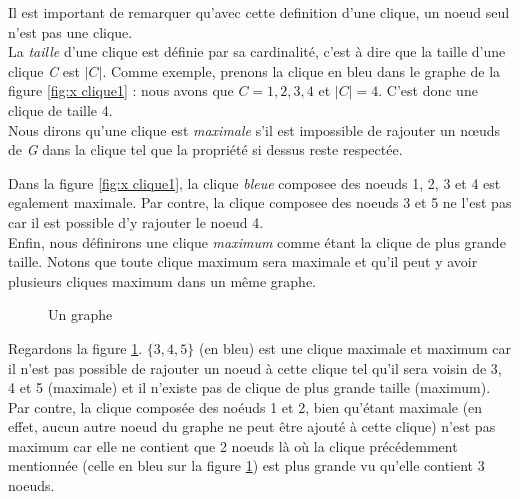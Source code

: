 \documentclass[a4paper, 12pt]{article}
\begin{document}
Il est important de remarquer qu'avec cette definition d'une clique, un noeud seul n'est pas une clique. \\

La \textit{taille} d'une clique est définie par sa cardinalité, c'est à dire que la taille d'une clique \emph{C} est \(|C|\). Comme exemple, prenons la clique en bleu dans le graphe de la figure \ref{fig:x clique1} : nous avons que \(C = {1,2,3,4}\) et \(|C| = 4\). C'est donc une clique de taille 4.\\

Nous dirons qu'une clique est \textit{maximale} s'il est impossible de rajouter un nœuds de \emph{G} dans la clique tel que la propriété si dessus reste respectée.

Dans la figure \ref{fig:x clique1}, la clique \textit{bleue} composee des noeuds 1, 2, 3 et 4 est egalement maximale. Par contre, la clique composee des noeuds 3 et 5 ne l'est pas car il est possible d'y rajouter le noeud 4.\\

Enfin, nous définirons une clique \textit{maximum} comme étant la clique de plus grande taille. Notons que toute clique maximum sera maximale et qu'il peut y avoir plusieurs cliques maximum dans un même graphe.

\begin{figure}[h]
  \begin{center}
\caption{Un graphe}
  \label{fig:x clique2}
\end{center}
\end{figure}

Regardons la figure \ref{fig:x clique2}. $ \{3, 4, 5\}$ (en bleu) est une clique maximale et maximum car il n'est pas possible de rajouter un noeud à cette clique tel qu'il sera voisin de 3, 4 et 5 (maximale) et il n'existe pas de clique de plus grande taille (maximum). Par contre, la clique composée des noéuds 1 et 2, bien qu'étant maximale (en effet, aucun autre noeud du graphe ne peut être ajouté à cette clique) n'est pas maximum car elle ne contient que 2 noeuds là où la clique précédemment mentionnée (celle en bleu sur la figure \ref{fig:x clique2}) est plus grande vu qu'elle contient 3 noeuds.
\end{document}
